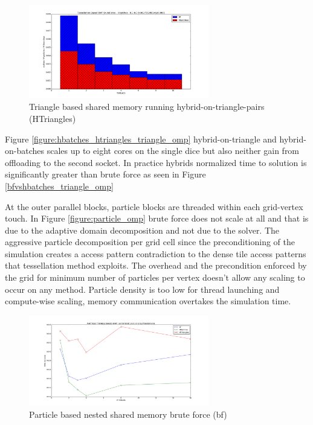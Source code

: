 \documentclass[times,12pt]{article}
\begin{document}
\begin{figure}[htb]
  \begin{center}
    \includegraphics[width=0.7\textwidth]{experiments/omp/bf_vs_hbatches_omp_200.png}
  \end{center}
  \caption{Triangle based shared memory running hybrid-on-triangle-pairs (HTriangles)}
  \label{figure:bfvshbatches_triangle_omp}
\end{figure}

Figure \ref{figure:hbatches_htriangles_triangle_omp} hybrid-on-triangle and hybrid-on-batches scales up to eight cores on the single dice but also neither gain from offloading to the second socket. In practice hybrids normalized time to solution is significantly greater than brute force as seen in Figure \ref{bfvshbatches_triangle_omp}



At the outer parallel blocks, particle blocks are threaded within each grid-vertex touch. In Figure \ref{figure:particle_omp} brute force does not scale at all and that is due to the adaptive domain decomposition and not due to the solver. The aggressive particle decomposition per grid cell since the preconditioning of the simulation creates a access pattern contradiction to the dense tile access patterns that tessellation method exploits. The overhead and the precondition enforced by the grid for minimum number of particles per vertex doesn't allow any scaling to occur on any method. Particle density is too low for thread launching and compute-wise scaling, memory communication overtakes the simulation time. 

\begin{figure}[htb]
  \begin{center}
    \includegraphics[width=0.7\textwidth]{experiments/random/omp/particle_triangle_based_x0.png}
  \end{center}
  \caption{Particle based nested shared memory brute force (bf)}
  \label{figure:particletriangle_omp}
\end{figure}
\end{document}
